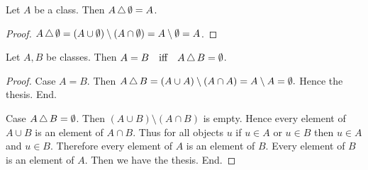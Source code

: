 \documentclass[10pt]{article}
\begin{document}
  \begin{forthel}
    \begin{proposition}
      Let $A$ be a class.
      Then $A \mathop{\triangle} \emptyset = A$.
    \end{proposition}
    \begin{proof}
      $A \mathop{\triangle} \emptyset
        = (A \cup \emptyset) \setminus (A \cap \emptyset)
        = A \setminus \emptyset
        = A$.
    \end{proof}
  \end{forthel}

  \begin{forthel}
    \begin{proposition}
      Let $A, B$ be classes.
      Then $A = B \quad \text{iff} \quad A \mathop{\triangle} B = \emptyset$.
    \end{proposition}
    \begin{proof}
      Case $A = B$.
        Then $A \mathop{\triangle} B
          = (A \cup A) \setminus (A \cap A)
          = A \setminus A
          = \emptyset.$
        Hence the thesis.
      End.

      Case $A \mathop{\triangle} B = \emptyset$.
        Then $(A \cup B) \setminus (A \cap B)$ is empty.
        Hence every element of $A \cup B$ is an element of $A \cap B$.
        Thus for all objects $u$ if $u \in A$ or $u \in B$ then $u \in A$ and $u \in B$.
        Therefore every element of $A$ is an element of $B$.
        Every element of $B$ is an element of $A$.
        Then we have the thesis.
      End.
    \end{proof}
  \end{forthel}
\end{document}

